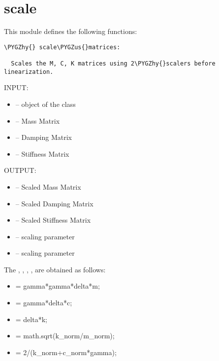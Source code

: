 \documentclass[letterpaper,10pt,english]{sphinxmanual}
\def\PYGZus{\char`\_}
\def\PYGZhy{\char`\-}
\begin{document}
\section{scale}
\label{index:scale}\label{index:module-scale}
This module defines the following functions:

\begin{Verbatim}[commandchars=\\\{\}]
\PYGZhy{} scale\PYGZus{}matrices:

  Scales the M, C, K matrices using 2\PYGZhy{}scalers before linearization.
\end{Verbatim}

\begin{fulllineitems}
\label{index:scale.scale_matrices}
INPUT:
\begin{itemize}
\item {} 
 -- object of the class 

\item {} 
 -- Mass Matrix

\item {} 
 -- Damping Matrix

\item {} 
 -- Stiffness Matrix

\end{itemize}

OUTPUT:
\begin{itemize}
\item {} 
 -- Scaled Mass Matrix

\item {} 
 -- Scaled Damping Matrix

\item {} 
 -- Scaled Stiffness Matrix

\item {} 
 -- scaling parameter

\item {} 
 -- scaling parameter

\end{itemize}

The  ,  , , ,   are obtained as follows:
\begin{itemize}
\item {} 
 = gamma*gamma*delta*m;

\item {} 
 = gamma*delta*c;

\item {} 
 = delta*k;

\item {} 
 = math.sqrt(k\_norm/m\_norm);

\item {} 
 = 2/(k\_norm+c\_norm*gamma);

\end{itemize}

\end{fulllineitems}
\end{document}
